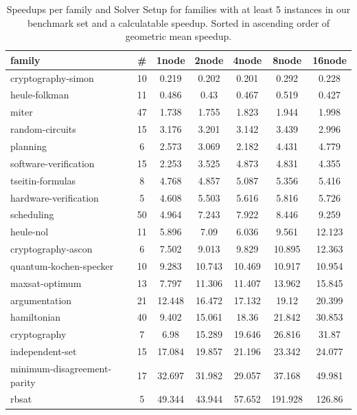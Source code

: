 \documentclass[12pt,a4paper,twoside]{scrartcl}
\numberwithin{equation}{section}
\begin{document}
\begin{table}
  \center
  \begin{tabular}{ lcccccc }
    \toprule
    family	&	\#	&	1node	&	2node	&	4node	&	8node	&	16node\\
    \midrule
    cryptography-simon	        &	10	&	0.219	&	0.202	&	0.201	&	0.292	&	0.228   \\
    heule-folkman	              &	11	&	0.486	&	0.43	&	0.467	&	0.519	&	0.427   \\
    miter	                      &	47	&	1.738	&	1.755	&	1.823	&	1.944	&	1.998   \\
    random-circuits	            &	15	&	3.176	&	3.201	&	3.142	&	3.439	&	2.996   \\
    planning	                  &	6	&	2.573	&	3.069	&	2.182	&	4.431	&	4.779   \\
    software-verification       &	15	&	2.253	&	3.525	&	4.873	&	4.831	&	4.355   \\
    tseitin-formulas	          &	8	&	4.768	&	4.857	&	5.087	&	5.356	&	5.416   \\
    hardware-verification	      &	5	&	4.608	&	5.503	&	5.616	&	5.816	&	5.726   \\
    scheduling	                &	50	&	4.964	&	7.243	&	7.922	&	8.446	&	9.259   \\
    heule-nol	                  &	11	&	5.896	&	7.09	&	6.036	&	9.561	&	12.123  \\
    cryptography-ascon	        &	6	&	7.502	&	9.013	&	9.829	&	10.895	&	12.363  \\
    quantum-kochen-specker	    &	10	&	9.283	&	10.743	&	10.469	&	10.917	&	10.954  \\
    maxsat-optimum	            &	13	&	7.797	&	11.306	&	11.407	&	13.962	&	15.845  \\
    argumentation	              &	21	&	12.448	&	16.472	&	17.132	&	19.12	&	20.399  \\
    hamiltonian	                &	40	&	9.402	&	15.061	&	18.36	&	21.842	&	30.853  \\
    cryptography	              &	7	&	6.98	&	15.289	&	19.646	&	26.816	&	31.87   \\
    independent-set	            &	15	&	17.084	&	19.857	&	21.196	&	23.342	&	24.077  \\
    minimum-disagreement-parity	&	17	&	32.697	&	31.982	&	29.057	&	37.168	&	49.981  \\
    rbsat	                      &	5	&	49.344	&	43.944	&	57.652	&	191.928	&	126.86  \\
    \bottomrule
  \end{tabular}
  \caption{Speedups per family and Solver Setup for families with at least 5 instances in our benchmark set and a calculatable speedup. Sorted in ascending order of geometric mean speedup.}
  \label{tab:speedupsSignificantFamilies}
\end{table}
\end{document}
